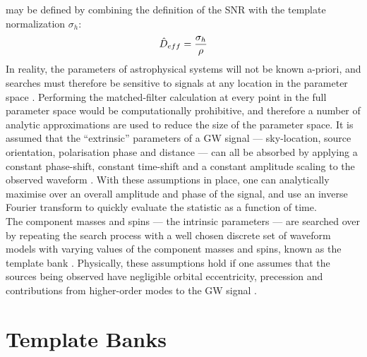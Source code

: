 \documentclass[binding=0.6cm, LaM]{sapthesis}
\begin{document}
	may be defined by combining the definition of the SNR with the template normalization $\sigma_h$:
		\begin{equation}
			\hat D_{eff} = {{\sigma_h} \over {\rho}}
		\end{equation}
	In reality, the parameters of astrophysical systems will not be known a-priori, 
	and searches must therefore be sensitive to signals at any location in the parameter space \cite{25}. 
	Performing the matched-filter calculation at every point in the full parameter space 
	would be computationally prohibitive, 
	and therefore a number of analytic approximations are used to reduce the size of the parameter space. 
	It is assumed that the ``extrinsic'' parameters of a GW signal --- 
	sky-location, source orientation, polarisation phase and distance --- 
	can all be absorbed by applying a constant phase-shift, 
	constant time-shift and a constant amplitude scaling to the observed waveform \cite{27}. 
	With these assumptions in place, 
	one can analytically maximise over an overall amplitude and phase of the signal, 
	and use an inverse Fourier transform to quickly evaluate the statistic as a function of time. \\
	The component masses and spins --- the intrinsic parameters --- 
	are searched over by repeating the search process with a well chosen discrete set of waveform models 
	with varying values of the component masses and spins, 
	known as the template bank \cite{27}. 
	Physically, these assumptions hold if one assumes that the sources being observed 
	have negligible orbital eccentricity, precession and contributions from higher-order modes 
	to the GW signal \cite{23}. 

\section{Template Banks}
\end{document}
